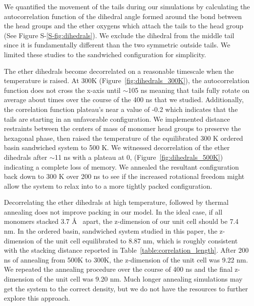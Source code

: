 \documentclass[journal=jpcbfk,manuscript=article]{achemso}
\begin{document}
  We quantified the movement of the tails during our simulations by calculating the 
  autocorrelation function of the dihedral angle formed around the bond between the 
  head groups and the ether oxygens which attach the tails to the head group 
  (See Figure S-\ref{S-fig:dihedrals}). We exclude the dihedral from the middle tail 
  since it is fundamentally different than the two symmetric outside tails. We 
  limited these studies to the sandwiched configuration for simplicity.
  
  The ether dihedrals become decorrelated on a reasonable timescale when the temperature
  is raised. At 300K (Figure~\ref{fig:dihedrals_300K}), the autocorrelation function does
  not cross the x-axis until $\sim$105 ns meaning that tails fully rotate on average about 
  times over the course of the 400 ns that we studied. Additionally, the correlation 
  function plateau's near a value of -0.2 which indicates that the tails are starting in 
  an unfavorable configuration. We implemented distance restraints between the centers of 
  mass of monomer head groups to preserve the hexagonal phase, then raised the temperature 
  of the equilibrated 300 K ordered basin sandwiched system to 500 K. We witnessed 
  decorrelation of the ether dihedrals after $\sim$11 ns with a plateau at 0, 
  (Figure~\ref{fig:dihedrals_500K}) indicating a complete loss of memory. We annealed
  the resultant configuration back down to 300 K over 200 ns to see if the increased rotational
  freedom might allow the system to relax into to a more tightly packed configuration.
  
  Decorrelating the ether dihedrals at high temperature, followed by thermal annealing
  does not improve packing in our model. In the ideal case, if all monomers stacked 
  3.7 \AA~ apart, the z-dimension of our unit cell should be 7.4 nm. In the ordered basin, 
  sandwiched system studied in this paper, the z-dimension of the unit cell equilibrated 
  to 8.87 nm, which is roughly consistent with the stacking distance reported in 
  Table~\ref{table:correlation_length}. After 200 ns of annealing from 500K to 300K, the 
  z-dimension of the unit cell was 9.22 nm. We repeated the annealing procedure over the 
  course of 400 ns and the final z-dimension of the unit cell was 9.20 nm. Much longer
  annealing simulations may get the system to the correct density, but we do not have
  the resources to further explore this approach. 
\end{document}
